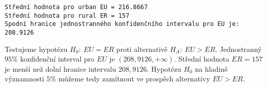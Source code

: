 \documentclass[11pt]{article}
\begin{document}
    \begin{Verbatim}[commandchars=\\\{\}]
Střední hodnota pro urban EU = 216.8667 
Střední hodnota pro rural ER = 157 
Spodní hranice jednostranného konfidenčního intervalu pro EU je: 208.9126 
    \end{Verbatim}

\noindent Testujeme hypotézu $H_0:\ EU = ER$ proti alternativě $H_A:\ EU > ER$. 
Jednostranný $95\%$ konfidenční interval pro $EU$ je $(208,9126,+\infty)$. 
Střední hodnota $ER = 157$ je menší než dolní hranice intervalu $208,9126$. 
Hypotézu $H_0$ na hladině významnosti $5\%$ můžeme tedy zamítnout ve prospěch alternativy $EU > ER$.

    
    
    
    
\end{document}
